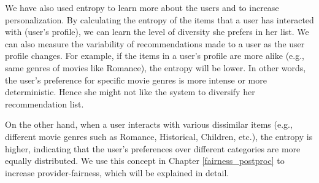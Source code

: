         We have also used entropy to learn more about the users and to increase personalization. By calculating the entropy of the items that a user has interacted with (user's profile), we can learn the level of diversity she prefers in her list. We can also measure the variability of recommendations made to a user as the user profile changes. 
        For example, if the items in a user's profile are more alike (e.g., same genres of movies like Romance), the entropy will be lower. In other words, the user's preference for specific movie genres is more intense or more deterministic. Hence she might not like the system to diversify her recommendation list.
        
        On the other hand, when a user interacts with various dissimilar items (e.g., different movie genres such as Romance, Historical, Children, etc.), the entropy is higher, indicating that the user's preferences over different categories are more equally distributed. We use this concept in Chapter \ref{fairness_postproc} to increase provider-fairness, which will be explained in detail.
        
        
        
    
    

        
        
            


